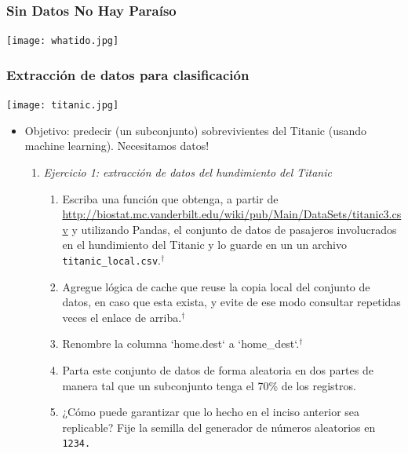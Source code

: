 \documentclass[leqno, 10pt, envcountsect]{beamer}
\numberwithin{equation}{section}
\theoremstyle{definition}
\theoremstyle{example}
\numberwithin{figure}{section}
\numberwithin{table}{section}
\let\olditem\item
\renewcommand{\item}{%
\olditem\vspace{1pt}}
\begin{document}
\begin{frame}[fragile=singleslide]
  \frametitle{Sin Datos No Hay Paraíso}
  \begin{center}
    \texttt{[image: whatido.jpg]}
  \end{center}
\end{frame}
\begin{frame}[fragile=singleslide]
  \frametitle{Extracción de datos para clasificación}
  \begin{center}
    \texttt{[image: titanic.jpg]}
  \end{center}
  \begin{itemize}
    \item Objetivo: predecir (un subconjunto) sobrevivientes del Titanic (usando machine
      learning). Necesitamos datos!
      \begin{enumerate}
            \item \textit{Ejercicio 1: extracción de datos del hundimiento del Titanic}
              \begin{enumerate}
                \item Escriba una función que obtenga, a partir de
                  \href{http://biostat.mc.vanderbilt.edu/wiki/pub/Main/DataSets/titanic3.csv}{http://biostat.mc.vanderbilt.edu/wiki/pub/Main/DataSets/titanic3.csv} y utilizando Pandas, el conjunto de datos de pasajeros
                  involucrados en el hundimiento del Titanic y lo guarde en un
                  un archivo \texttt{titanic_local.csv}.$^{\dag}$
                \item Agregue lógica de cache que reuse la copia local del
                  conjunto de datos, en caso que esta exista, y evite de ese
                  modo consultar repetidas veces el enlace de arriba.$^{\dag}$
                \item Renombre la columna `home.dest` a `home\_dest`.$^{\dag}$
                \item Parta este conjunto de datos de forma aleatoria en dos
                  partes de manera tal que un subconjunto tenga el 70\% de los
                  registros.
                \item ¿Cómo puede garantizar que lo hecho en el inciso anterior
                  sea replicable?  Fije la semilla del generador de números
                  aleatorios en \texttt{1234.}
              \end{enumerate}
        \end{enumerate}
  \end{itemize}
\end{frame}
\end{document}

